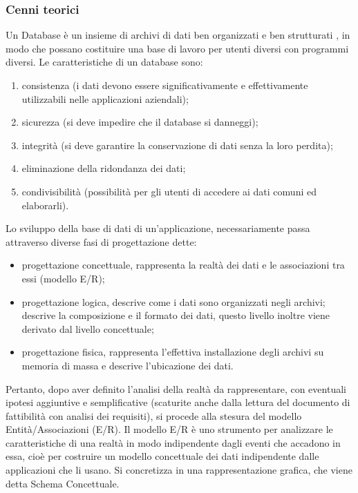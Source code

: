 \documentclass{article}
\begin{document}
	\subsubsection{\textbf{Cenni teorici}}
	Un Database è un insieme di archivi di dati ben organizzati e ben strutturati , in modo
	che possano costituire una base di lavoro per utenti diversi con programmi diversi.
	Le caratteristiche di un database sono:
	\begin{enumerate}
		\item consistenza (i dati devono essere significativamente e effettivamente utilizzabili
		nelle applicazioni aziendali);
		\item sicurezza (si deve impedire che il database si danneggi);
		\item integrità (si deve garantire la conservazione di dati senza la loro perdita);
		\item eliminazione della ridondanza dei dati;
		\item condivisibilità (possibilità per gli utenti di accedere ai dati comuni ed
		elaborarli).
	\end{enumerate}
	Lo sviluppo della base di dati di un’applicazione, necessariamente passa attraverso
	diverse fasi di progettazione dette:
	\begin{itemize}
		\item progettazione concettuale, rappresenta la realtà dei dati e le associazioni tra
		essi (modello E/R);
		\item progettazione logica, descrive come i dati sono organizzati negli archivi;
		descrive la composizione e il formato dei dati, questo livello inoltre viene
		derivato dal livello concettuale;
		\item progettazione fisica, rappresenta l’effettiva installazione degli archivi su
		memoria di massa e descrive l’ubicazione dei dati.
	\end{itemize}
	Pertanto, dopo aver definito l’analisi della realtà da rappresentare, con eventuali ipotesi
	aggiuntive e semplificative (scaturite anche dalla lettura del documento di fattibilità
	con analisi dei requisiti), si procede alla stesura del modello Entità/Associazioni (E/R).
	Il modello E/R è uno strumento per analizzare le caratteristiche di una realtà in modo
	indipendente dagli eventi che accadono in essa, cioè per costruire un modello
	concettuale dei dati indipendente dalle applicazioni che li usano.
	Si concretizza in una rappresentazione grafica, che viene detta Schema Concettuale.
	
\end{document}
